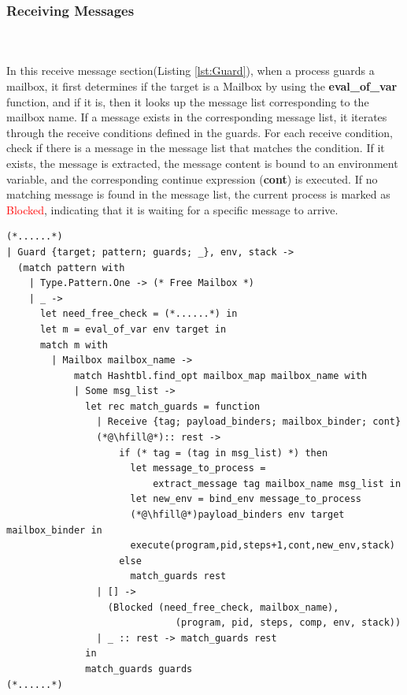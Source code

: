 \documentclass{l4proj}
\begin{document}
\subsubsection{Receiving Messages} \hfill\\\\
In this receive message section(Listing \ref{lst:Guard}), when a process guards a mailbox, it first determines if the target is a Mailbox by using the \textbf{eval\_of\_var} function, and if it is, then it looks up the message list corresponding to the mailbox name. If a message exists in the corresponding message list, it iterates through the receive conditions defined in the guards. For each receive condition, check if there is a message in the message list that matches the condition. If it exists, the message is extracted, the message content is bound to an environment variable, and the corresponding continue expression (\textbf{cont}) is executed. If no matching message is found in the message list, the current process is marked as \textcolor{red}{Blocked}, indicating that it is waiting for a specific message to arrive.

\noindent\begin{minipage}{\linewidth}
\lstset{style=Ocamlstyle,}
\begin{lstlisting}[caption={Message Reception and Guard Evaluation in Pat Language}, label={lst:Guard}]
(*......*)
| Guard {target; pattern; guards; _}, env, stack ->
  (match pattern with  
    | Type.Pattern.One -> (* Free Mailbox *)
    | _ ->
      let need_free_check = (*......*) in
      let m = eval_of_var env target in
      match m with
        | Mailbox mailbox_name ->
            match Hashtbl.find_opt mailbox_map mailbox_name with
            | Some msg_list -> 
              let rec match_guards = function
                | Receive {tag; payload_binders; mailbox_binder; cont} 
                (*@\hfill@*):: rest ->
                    if (* tag = (tag in msg_list) *) then
                      let message_to_process = 
                          extract_message tag mailbox_name msg_list in
                      let new_env = bind_env message_to_process 
                      (*@\hfill@*)payload_binders env target mailbox_binder in
                      execute(program,pid,steps+1,cont,new_env,stack)
                    else
                      match_guards rest
                | [] -> 
                  (Blocked (need_free_check, mailbox_name), 
                              (program, pid, steps, comp, env, stack))
                | _ :: rest -> match_guards rest 
              in
              match_guards guards
(*......*)
\end{lstlisting}
\end{minipage}
\end{document}
